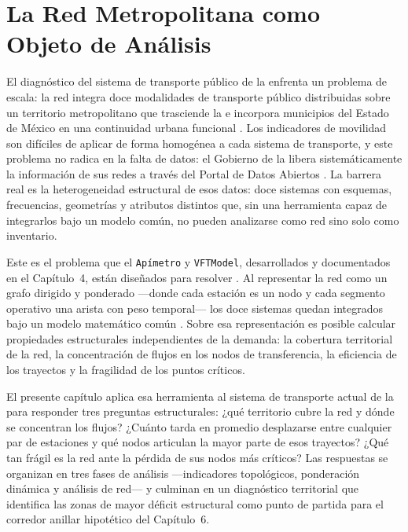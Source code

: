 \section{La Red Metropolitana como Objeto de Análisis}
\label{sec:red-objeto-analisis}

El diagnóstico del sistema de transporte público de la \zmvm{} enfrenta un
problema de escala: la red integra doce modalidades de transporte público
distribuidas sobre un territorio metropolitano que trasciende la \cdmx{} e
incorpora municipios del Estado de México en una continuidad urbana funcional
\citep{semovi2020diagnostico}. Los indicadores de movilidad son difíciles de
aplicar de forma homogénea a cada sistema de transporte, y este problema no
radica en la falta de datos: el Gobierno de la \cdmx{} libera sistemáticamente
la información de sus redes a través del Portal de Datos Abiertos
\citep{adip_gtfs_2024}. La barrera real es la heterogeneidad estructural de esos
datos: doce sistemas con esquemas, frecuencias, geometrías y atributos distintos
que, sin una herramienta capaz de integrarlos bajo un modelo común, no pueden
analizarse como red sino solo como inventario.

Este es el problema que el \texttt{Apímetro} y \texttt{VFTModel},
desarrollados y documentados en el Capítulo~4, están diseñados para resolver
\citep{cabrera2025apimetro, cabrera2026VFTModel}. Al representar la red como un
grafo dirigido y ponderado —donde cada estación es un nodo y cada segmento
operativo una arista con peso temporal— los doce sistemas quedan integrados bajo
un modelo matemático común \citep{newman2010networks}. Sobre esa representación
es posible calcular propiedades estructurales independientes de la demanda: la
cobertura territorial de la red, la concentración de flujos en los nodos de
transferencia, la eficiencia de los trayectos y la fragilidad de los puntos
críticos.

El presente capítulo aplica esa herramienta al sistema de transporte actual de
la \zmvm{} para responder tres preguntas estructurales: ¿qué territorio cubre la
red y dónde se concentran los flujos? ¿Cuánto tarda en promedio desplazarse
entre cualquier par de estaciones y qué nodos articulan la mayor parte de esos
trayectos? ¿Qué tan frágil es la red ante la pérdida de sus nodos más críticos?
Las respuestas se organizan en tres fases de análisis —indicadores topológicos,
ponderación dinámica y análisis de red— y culminan en un diagnóstico territorial
que identifica las zonas de mayor déficit estructural como punto de partida para
el corredor anillar hipotético del Capítulo~6.

